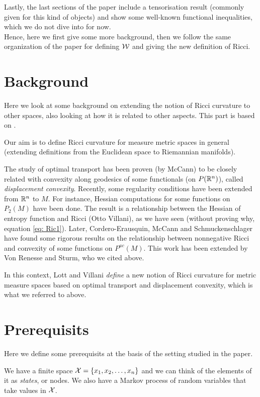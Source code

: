 Lastly, the last sections of the paper include a tensorisation result (commonly given for this kind of objects) and show some well-known functional inequalities, which we do not dive into for now. 
\\

Hence, here we first give some more background, then we follow the same organization of the paper for defining $\mathcal{W}$ and giving the new definition of Ricci. 

\section{Background} \label{sec: lottvill}
Here we look at some background on extending the notion of Ricci curvature to other spaces, also looking at how it is related to other aspects. This part is based on \cite{lott2009ricci}. 

Our aim is to define Ricci curvature for measure metric spaces in general (extending definitions from the Euclidean space to Riemannian manifolds). 

The study of optimal transport has been proven (by McCann) to be closely related with convexity along geodesics of some functionals (on $P(\mathbb{R}^n)$), called \textit{displacement convexity}. 
Recently, some regularity conditions have been extended from $\mathbb{R}^n$ to $M$. For instance, Hessian computations for some functions on $P_2(M)$ have been done. The result is a relationship between the Hessian of entropy function and Ricci (Otto Villani), as we have seen (without proving why, equation \ref{eq: Ric1}). Later, Cordero-Erausquin, McCann and Schmuckenschlager have found some rigorous results on the relationship between nonnegative Ricci and convexity of some functions on $P^{ac}(M)$. This work has been extended by Von Renesse and Sturm, who we cited above. 

In this context, Lott and Villani \emph{define} a new notion of Ricci curvature for metric measure spaces based on optimal transport and displacement convexity, which is what we referred to above. 

\section{Prerequisits}
Here we define some prerequisits at the basis of the setting studied in the paper. 

We have a finite space $\mathcal{X}=\{x_1, x_2, \ldots, x_n\}$ and we can think of the elements of it as \emph{states}, or nodes. We also have a Markov process of random variables that take values in $\mathcal{X}$.

